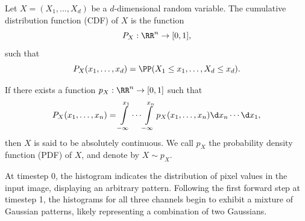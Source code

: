 \begin{definition}
  Let $X=(X_1,\ldots, X_d)$ be a $d$-dimensional random variable.
  The cumulative distribution function (CDF) of $X$ is the function
  $$P_X:\RR^n\to [0,1],$$
  such that
  \begin{equation}
    P_X(x_1,\ldots,x_d)=\PP(X_1\le x_1,\ldots,X_d\le x_d).
  \end{equation}

  If there exists a function $p_X:\RR^n\to [0,1]$ such that
  $$P_X(x_1,\ldots,x_n)=\int\limits_{-\infty}^{x_1}\cdots\int\limits_{-\infty}^{x_n}p_X(x_1,\ldots,x_n)\d x_n\cdots\d x_1,$$
  then $X$ is said to be absolutely continuous. We call $p_X$ the probability density function (PDF) of $X$, and denote by $X\sim p_X$.
\end{definition}

At timestep 0, the histogram indicates the distribution of pixel values in the input image, displaying an arbitrary pattern. Following the first forward step at timestep 1, the histograms for all three channels begin to exhibit a mixture of Gaussian patterns, likely representing a combination of two Gaussians.



